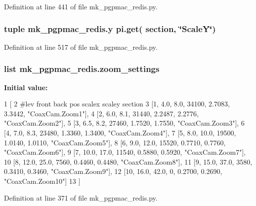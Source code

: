 Definition at line 441 of file mk\-\_\-pgpmac\-\_\-redis.\-py.

\hypertarget{namespacemk__pgpmac__redis_a34220d58136fb95853f54ed51a130f79}{
\subsubsection[{y}]{\setlength{\rightskip}{0pt plus 5cm}tuple mk\-\_\-pgpmac\-\_\-redis.\-y pi.\-get( section, \char`\"{}Scale\-Y\char`\"{})}}\label{namespacemk__pgpmac__redis_a34220d58136fb95853f54ed51a130f79}


Definition at line 517 of file mk\-\_\-pgpmac\-\_\-redis.\-py.

\hypertarget{namespacemk__pgpmac__redis_ad91bac9be746f99e1cf1f8e28ff348be}{
\subsubsection[{zoom\-\_\-settings}]{\setlength{\rightskip}{0pt plus 5cm}list mk\-\_\-pgpmac\-\_\-redis.\-zoom\-\_\-settings}}\label{namespacemk__pgpmac__redis_ad91bac9be746f99e1cf1f8e28ff348be}
{\bfseries Initial value\-:}
\begin{DoxyCode}
1 [
2     \textcolor{comment}{#lev   front  back  pos     scalex  scaley   section}
3     [1,     4.0,   8.0,  34100, 2.7083,  3.3442, \textcolor{stringliteral}{"CoaxCam.Zoom1"}],
4     [2,     6.0,   8.1,  31440, 2.2487,  2.2776, \textcolor{stringliteral}{"CoaxCam.Zoom2"}],
5     [3,     6.5,   8.2,  27460, 1.7520,  1.7550, \textcolor{stringliteral}{"CoaxCam.Zoom3"}],
6     [4,     7.0,   8.3,  23480, 1.3360,  1.3400, \textcolor{stringliteral}{"CoaxCam.Zoom4"}],
7     [5,     8.0,  10.0,  19500, 1.0140,  1.0110, \textcolor{stringliteral}{"CoaxCam.Zoom5"}],
8     [6,     9.0,  12.0,  15520, 0.7710,  0.7760, \textcolor{stringliteral}{"CoaxCam.Zoom6"}],
9     [7,    10.0,  17.0,  11540, 0.5880,  0.5920, \textcolor{stringliteral}{"CoaxCam.Zoom7"}],
10     [8,    12.0,  25.0,   7560, 0.4460,  0.4480, \textcolor{stringliteral}{"CoaxCam.Zoom8"}],
11     [9,    15.0,  37.0,   3580, 0.3410,  0.3460, \textcolor{stringliteral}{"CoaxCam.Zoom9"}],
12     [10,   16.0,  42.0,      0, 0.2700,  0.2690, \textcolor{stringliteral}{"CoaxCam.Zoom10"}]
13     ]
\end{DoxyCode}


Definition at line 371 of file mk\-\_\-pgpmac\-\_\-redis.\-py.

